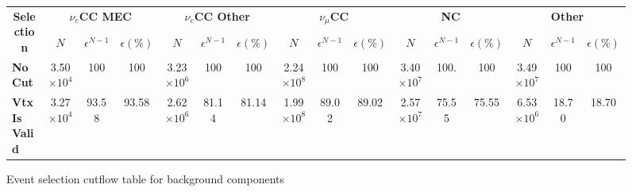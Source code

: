 \begin{figure}
\caption{Event selection cutflow table for background components}
\begin{scriptsize}
\begin{tabular}{|l|ccc|ccc|ccc|ccc|ccc|}\hline
\multicolumn{1}{|c|}{\multirow{2}{*}{\textbf{Selection}}} & \multicolumn{3}{c|}{\textbf{$\nu_e$CC MEC}} &
\multicolumn{3}{c|}{\textbf{$\nu_e$CC Other}} &
\multicolumn{3}{c|}{\textbf{$\nu_\mu$CC}} &
\multicolumn{3}{c|}{\textbf{NC}} &
\multicolumn{3}{c|}{\textbf{Other}} \\
\multicolumn{1}{|c|}{}                                    & \multicolumn{1}{c}{\textbf{$N$}} & \textbf{$\epsilon^{N-1}$} & \textbf{$\epsilon \left(\%\right)$} & \multicolumn{1}{c}{\textbf{$N$}} & \textbf{$\epsilon^{N-1}$} & \textbf{$\epsilon \left(\%\right)$} & \multicolumn{1}{c}{\textbf{$N$}} & \textbf{$\epsilon^{N-1}$} & \textbf{$\epsilon \left(\%\right)$} & \multicolumn{1}{c}{\textbf{$N$}} & \textbf{$\epsilon^{N-1}$} & \textbf{$\epsilon \left(\%\right)$} & \multicolumn{1}{c}{\textbf{$N$}} & \textbf{$\epsilon^{N-1}$} & \textbf{$\epsilon \left(\%\right)$} \\\hline
\textbf{No Cut}      & 3.50$\times 10^4$           & 100 & 100                                     & 3.23$\times 10^6$             & 100 & 100 & 2.24$\times 10^8$              & 100                                                                 & 100                                        & 3.40$\times 10^7$          & 100.                                                             & 100                                    & 3.49$\times 10^7$                      & 100 & 100                                       \\
\textbf{Vtx Is Valid}  & 3.27$\times 10^4$           & 93.58                                                               & 93.58                                      & 2.62$\times 10^6$             & 81.14                                                                 & 81.14                                        & 1.99$\times 10^8$              & 89.02                                                                  & 89.02                                         & 2.57$\times 10^7$ & 75.55                                                              & 75.55                                     & 6.53$\times 10^6$             & 18.70                                                                 & 18.70                                        \\

\end{tabular}
\end{scriptsize}
\end{figure}
